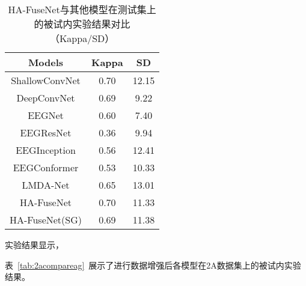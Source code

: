 \begin{table}[ht]
\end{table}

\begin{table}[ht]
    \centering
    \caption{HA-FuseNet与其他模型在测试集上的被试内实验结果对比（Kappa/SD）}
    \label{tab:2acompareinsd}
    \begin{tabularx}{\textwidth}{CCC}
      \toprule
      Models & Kappa & SD \\
      \midrule
      ShallowConvNet\cite{schirrmeister2017deep} & 0.70 & 12.15\\
      DeepConvNet\cite{schirrmeister2017deep} & 0.69 & 9.22 \\
      EEGNet\cite{lawhern2018eegnet} & 0.60 & 7.40 \\
      EEGResNet\cite{HBM:HBM23730} & 0.36 & 9.94 \\
      EEGInception\cite{zhang2021eeg} & 0.56 & 12.41 \\
      EEGConformer\cite{song2022eeg} & 0.53 & 10.33 \\
      LMDA-Net\cite{miao2023lmda} & 0.65 & 13.01 \\
      \midrule 
      HA-FuseNet &0.70&11.33\\
      HA-FuseNet(SG) &0.69&11.38\\
      \bottomrule
    \end{tabularx}
\end{table}

实验结果显示，

表~\ref{tab:2acompareag}~展示了进行数据增强后各模型在2A数据集上的被试内实验结果。

